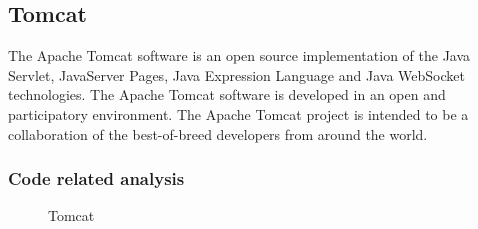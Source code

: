\documentclass[]{usiinfbachelorproject}
\begin{document}
\subsection{Tomcat}
The Apache Tomcat software is an open source implementation of the Java Servlet, JavaServer Pages, Java Expression Language and Java WebSocket technologies. 
The Apache Tomcat software is developed in an open and participatory environment. The Apache Tomcat project is intended to be a collaboration of the best-of-breed developers from around the world.

\subsubsection{Code related analysis}

        \begin{figure}[h]
        \centering
        \hspace*{\fill}
        
        \hspace*{\fill}
        
        \caption{Tomcat \label{fig:tomcat}
        }
        
        \end{figure}
\end{document}
